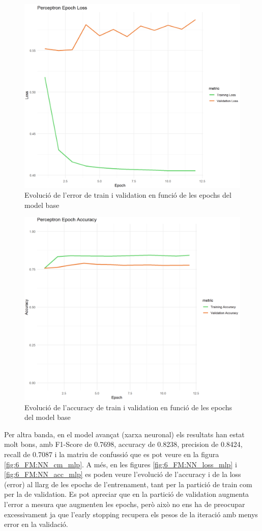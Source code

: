 \begin{figure}[H]
    \centering
    \includegraphics[width=0.65\linewidth]{Images/6_Factorial_Methods/NN/loss_perc.png}
    \caption{Evolució de l'error de train i validation en funció de les epochs del model base}
    \label{fig:6_FM:NN_loss_perc}
\end{figure}

\begin{figure}[H]
    \centering
    \includegraphics[width=0.65\linewidth]{Images/6_Factorial_Methods/NN/acc_perc.png}
    \caption{Evolució de l'accuracy de train i validation en funció de les epochs del model base}
    \label{fig:6_FM:NN_acc_perc}
\end{figure}

Per altra banda, en el model avançat (xarxa neuronal) els resultats han estat molt bons, amb F1-Score de 0.7698, accuracy de 0.8238,  precision de 0.8424, recall de 0.7087 i la matriu de confussió que es pot veure en la figura \ref{fig:6_FM:NN_cm_mlp}. A més, en les figures \ref{fig:6_FM:NN_loss_mlp} i \ref{fig:6_FM:NN_acc_mlp} es poden veure l'evolució de l'accuracy i de la loss (error) al llarg de les epochs de l'entrenament, tant per la partició de train com per la de validation. Es pot apreciar que en la partició de validation augmenta l'error a mesura que augmenten les epochs, però això no ens ha de preocupar excessivament ja que l'early stopping recupera els pesos de la iteració amb menys error en la validació.

